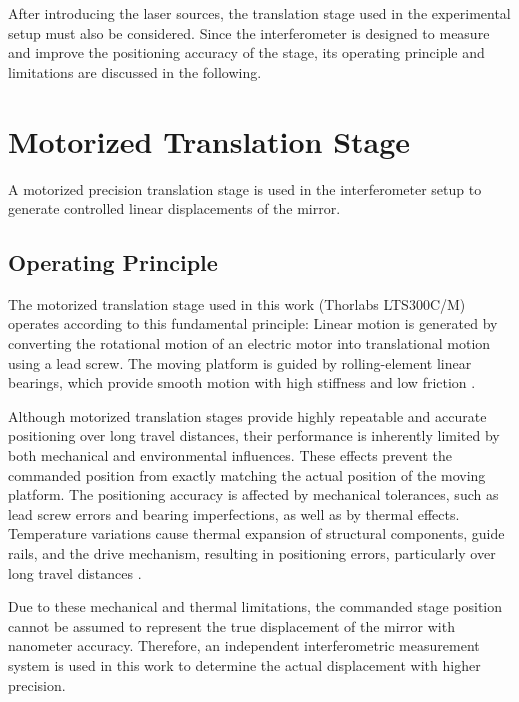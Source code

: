 After introducing the laser sources, the translation stage used in the experimental setup must also be considered. Since the interferometer is designed to measure and improve the positioning accuracy of the stage, its operating principle and limitations are discussed in the following.

\section{Motorized Translation Stage}

A motorized precision translation stage is used in the interferometer setup to generate controlled linear displacements of the mirror.

\subsection{Operating Principle}

The motorized translation stage used in this work (Thorlabs LTS300C/M) operates according to this fundamental principle: Linear motion is generated by converting the rotational motion of an electric motor into translational motion using a lead screw. The moving platform is guided by rolling-element linear bearings, which provide smooth motion with high stiffness and low friction .

Although motorized translation stages provide highly repeatable and accurate positioning over long travel distances, their performance is inherently limited by both mechanical and environmental influences. These effects prevent the commanded position from exactly matching the actual position of the moving platform. The positioning accuracy is affected by mechanical tolerances, such as lead screw errors and bearing imperfections, as well as by thermal effects. Temperature variations cause thermal expansion of structural components, guide rails, and the drive mechanism, resulting in positioning errors, particularly over long travel distances .

Due to these mechanical and thermal limitations, the commanded stage position cannot be assumed to represent the true displacement of the mirror with nanometer accuracy. Therefore, an independent interferometric measurement system is used in this work to determine the actual displacement with higher precision.
